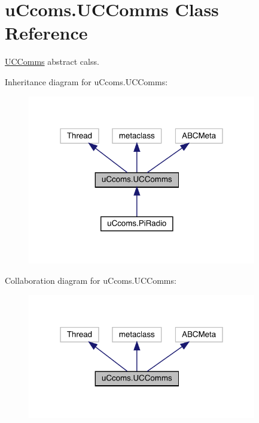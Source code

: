 \hypertarget{classu_ccoms_1_1_u_c_comms}{}\section{u\+Ccoms.\+U\+C\+Comms Class Reference}
\label{classu_ccoms_1_1_u_c_comms}


\mbox{\hyperlink{classu_ccoms_1_1_u_c_comms}{U\+C\+Comms}} abstract calss.  




Inheritance diagram for u\+Ccoms.\+U\+C\+Comms\+:\nopagebreak
\begin{figure}[H]
\begin{center}
\leavevmode
\includegraphics[width=283pt]{classu_ccoms_1_1_u_c_comms__inherit__graph}
\end{center}
\end{figure}


Collaboration diagram for u\+Ccoms.\+U\+C\+Comms\+:\nopagebreak
\begin{figure}[H]
\begin{center}
\leavevmode
\includegraphics[width=283pt]{classu_ccoms_1_1_u_c_comms__coll__graph}
\end{center}
\end{figure}

